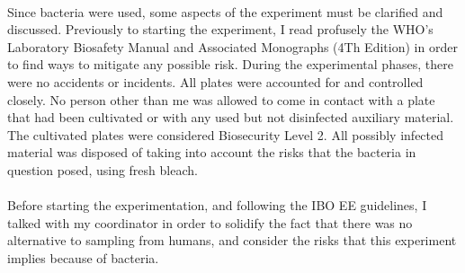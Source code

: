 \paragraph{}Since bacteria were used, some aspects of the experiment must be clarified and discussed. Previously to starting the experiment, I read profusely the WHO's Laboratory Biosafety Manual and Associated Monographs (4Th Edition)\cite{worldhealthorganizationLaboratoryBiosafetyManual2020} in order to find ways to mitigate any possible risk. During the experimental phases, there were no accidents or incidents. All plates were accounted for and controlled closely. No person other than me was allowed to come in contact with a plate that had been cultivated or with any used but not disinfected auxiliary material. The cultivated plates were considered Biosecurity Level 2. All possibly infected material was disposed of taking into account the risks that the bacteria in question posed, using fresh bleach.
\paragraph{}Before starting the experimentation, and following the IBO EE guidelines, I talked with my coordinator in order to solidify the fact that there was no alternative to sampling from humans, and consider the risks that this experiment implies because of bacteria.

